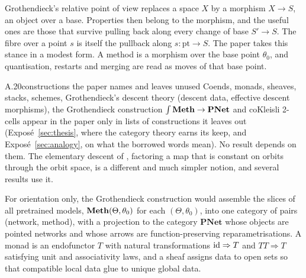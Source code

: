 Grothendieck's relative point of view replaces a space $X$ by a morphism $X\to S$, an object over a base. Properties then
belong to the morphism, and the useful ones are those that survive pulling back along every change of base $S'\to S$. The
fibre over a point $s$ is itself the pullback along $s:\mathrm{pt}\to S$. The paper takes this stance in a modest form. A
method is a morphism over the base point $\theta_0$, and quantisation, restarts and merging are read as moves of that
base point.


\begin{bgentry}{A.20}{constructions the paper names and leaves unused}
Coends, monads, sheaves, stacks, schemes, Grothendieck's descent theory (descent data, effective descent morphisms), the
Grothendieck construction $\int\mathbf{Meth}\to\mathbf{PNet}$ and coKleisli 2-cells appear in the paper only in lists of
constructions it leaves out (Exposé~\ref{sec:thesis}, where the category theory earns its keep, and
Exposé~\ref{sec:analogy}, on what the borrowed words mean). No result depends on them. The elementary descent of
, factoring a map that is constant on orbits through the orbit space, is a different and much simpler notion,
and several results use it.
\end{bgentry}

For orientation only, the Grothendieck construction would assemble the slices of all pretrained models,
$\mathbf{Meth}(\Theta,\theta_0)$ for each $(\Theta,\theta_0)$, into one category of pairs (network, method), with a projection to the category $\mathbf{PNet}$ whose objects are pointed networks and whose arrows are
function-preserving reparametrisations. A monad is an endofunctor $T$ with natural transformations
$\mathrm{id}\Rightarrow T$ and $TT\Rightarrow T$ satisfying unit and associativity laws, and a sheaf assigns data to open sets so
that compatible local data glue to unique global data.


